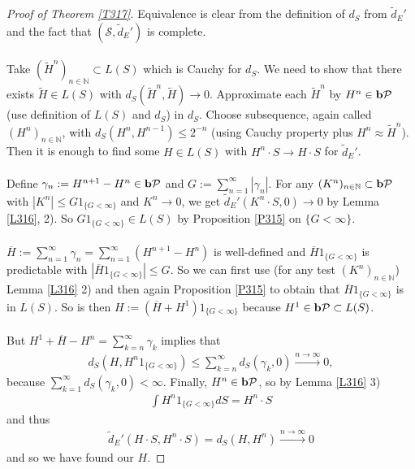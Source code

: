 \documentclass[12pt,a4paper, twoside]{article}
\theoremstyle{definition}
\newcommand{\pred}{\textbf{\text{b}}\mathcal{P}}
\begin{document}
\begin{proof}[Proof of Theorem \ref{T317}] Equivalence is clear from the definition of $d_S$ from $\widetilde{d}_E'$ and the fact that $( \mathcal{S}, \widetilde{d}_E')$ is complete. \\
\\
Take $(\widetilde{H}^n)_{n \in \mathbb{N}} \subset L(S)$ which is Cauchy for $d_S$. We need to show that there exists $\widetilde{H} \in L(S)$ with $d_S( \widetilde{H}^n, \widetilde{H}) \to 0$. Approximate each $\widetilde{H}^n$ by $H^n \in \pred$ (use definition of $L(S)$ and $d_S$) in $d_S$. Choose subsequence, again called $(H^n)_{n \in \mathbb{N}}$, with $d_S(H^n, H^{n-1}) \leq 2^{-n}$ (using Cauchy property plus $H^n \approx \widetilde{H}^n$). Then it is enough to find some $H \in L(S)$ with $H^n \cdot S \to H \cdot S$ for $\widetilde{d}_E'$. \\
\\
Define $\gamma_n := H^{n+1}-H^n \in \pred$ and $G:= \sum_{n=1}^\infty | \gamma_n|$. For any $(K^n)_{n \in \mathbb{N}} \subset \pred$ with $|K^n| \leq G1_{\{ G < \infty \}}$ and $K^n \to 0$, we get $\widetilde{d}_E'(K^n \cdot S,0) \to 0$ by Lemma \ref{L316}, 2). So $G1_{\{ G < \infty \}} \in L(S)$ by Proposition \ref{P315} on $\{G < \infty\}$. \\
\\
$\overline{H}:= \sum_{n=1}^\infty \gamma_n = \sum_{n=1}^\infty (H^{n+1}-H^n)$ is well-defined and $\overline{H}1_{\{ G < \infty\}}$ is predictable with $| \overline{H} 1_{\{ G < \infty\}} | \leq G$. So we can first use (for any test $(K^n)_{n \in \mathbb{N}}$) Lemma \ref{L316} 2) and then again Proposition \ref{P315} to obtain that $\overline{H}1_{\{ G < \infty\}}$ is in $L(S)$. So is then $H:= (\overline{H}+H^1)1_{\{ G < \infty\}}$ because $H^1 \in \pred \subset L(S)$. \\
\\
But $H^1 + \overline{H}-H^n = \sum_{k=n}^\infty \gamma_k$ implies that 
\begin{align*}
d_S(H, H^n 1_{\{ G < \infty\}}) \leq \sum_{k=n}^\infty d_S( \gamma_k,0) \xrightarrow{n \to \infty} 0,
\end{align*}
because $\sum_{k=1}^\infty d_S( \gamma_k, 0) < \infty$.  Finally, $H^n \in \pred$, so by Lemma \ref{L316} 3) 
\begin{align*}
\int H^n 1_{\{ G < \infty\}} dS = H^n \cdot S
\end{align*}
and thus 
\begin{align*}
\widetilde{d}_E' ( H \cdot S, H^n \cdot S) = d_S( H, H^n) \xrightarrow{n \to \infty} 0
\end{align*}
and so we have found our $H$. 
\end{proof}
\newpage
\end{document}
